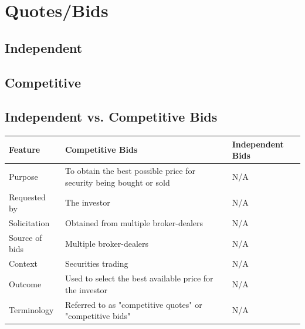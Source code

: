 \documentclass[11pt]{article}
\begin{document}
\section{Quotes/Bids}
\label{sec:org3de983c}
\subsection{Independent}
\label{sec:org368573a}
\subsection{Competitive}
\label{sec:orgb94218f}

\subsection{Independent vs. Competitive Bids}
\label{sec:org1e63473}
\begin{center}
\begin{tabular}{lll}
\hline
Feature & Competitive Bids & Independent Bids\\[0pt]
\hline
Purpose & To obtain the best possible price for security being bought or sold & N/A\\[0pt]
Requested by & The investor & N/A\\[0pt]
Solicitation & Obtained from multiple broker-dealers & N/A\\[0pt]
Source of bids & Multiple broker-dealers & N/A\\[0pt]
Context & Securities trading & N/A\\[0pt]
Outcome & Used to select the best available price for the investor & N/A\\[0pt]
Terminology & Referred to as "competitive quotes" or "competitive bids" & N/A\\[0pt]
\hline
\end{tabular}
\end{center}
\end{document}
